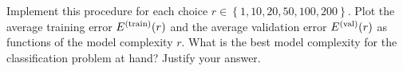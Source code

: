 \documentclass[article,11pt]{article}
\begin{document}
Implement this procedure for each choice $r \in \left\lbrace 1,10,20,50,100,200  \right\rbrace $.  
Plot the average training error $E^{(\rm train)}(r)$ and the average validation error $E^{(\rm val)}(r)$ 
as functions of the model complexity $r$. What is the best model complexity for the classification problem at hand? Justify your answer.


%
%
%
%
\end{document}
